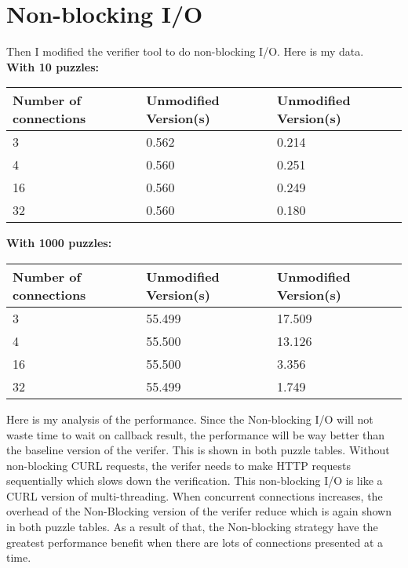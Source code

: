 \documentclass[12pt]{article}
\begin{document}
\section{Non-blocking I/O}
Then I modified the verifier tool to do non-blocking I/O. Here is my data. \\ 
\textbf{With 10 puzzles:} 
\begin{center}
    \begin{tabular}{ | l | l | l |}
    \hline
    Number of connections & Unmodified Version(s) & Unmodified Version(s) \\ 
    \hline
    3 & 0.562 & 0.214 \\ 
    \hline
    4 & 0.560 & 0.251 \\ 
    \hline
    16 & 0.560 & 0.249 \\ 
    \hline
    32 & 0.560 & 0.180 \\ 
    \hline
    \end{tabular}
\end{center} 
\textbf{With 1000 puzzles:} 
\begin{center}
    \begin{tabular}{ | l | l | l |}
    \hline
    Number of connections & Unmodified Version(s) & Unmodified Version(s) \\ 
    \hline
    3 & 55.499 & 17.509 \\ 
    \hline
    4 & 55.500 & 13.126 \\ 
    \hline
    16 & 55.500 & 3.356 \\ 
    \hline
    32 & 55.499 & 1.749 \\ 
    \hline
    \end{tabular}
\end{center} 
\indent
Here is my analysis of the performance. Since the Non-blocking I/O will not waste time to wait on callback result, the performance will be way better than the baseline version of the verifer. This is shown in both puzzle tables. Without non-blocking CURL requests, the verifer needs to make HTTP requests sequentially which slows down the verification. This non-blocking I/O is like a CURL version of multi-threading. When concurrent connections increases, the overhead of the Non-Blocking version of the verifer reduce which is again shown in both puzzle tables. As a result of that, the Non-blocking strategy have the greatest performance benefit when there are lots of connections presented at a time.
\end{document}

